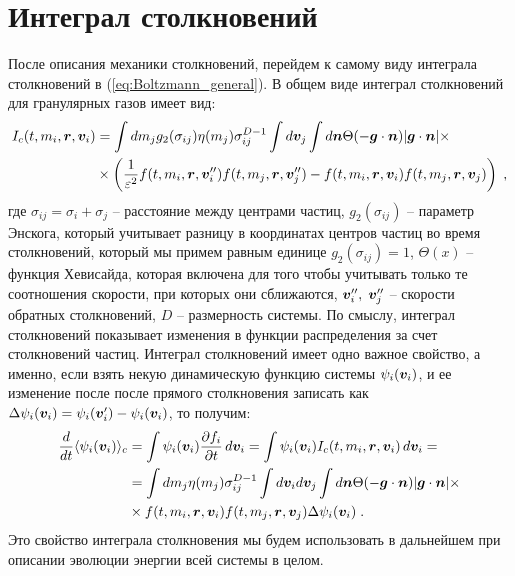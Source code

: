 \section{Интеграл столкновений}
После описания механики столкновений, перейдем к самому виду интеграла столкновений в (\ref{eq:Boltzmann_general}).
В общем виде интеграл столкновений для гранулярных газов имеет вид:
\begin{equation}
  \begin{split}
    I_c(t,m_i,\bm{r},\bm{v}_i) &= \int dm_jg_2(\sigma_{ij})\eta(m_j)\sigma^{D-1}_{ij}\int d\bm{v}_j\int d\bm{n}\Theta(-\bm{g}\cdot\bm{n})\vert\bm{g}\cdot\bm{n}\vert\times\\
    &\times\left(\frac{1}{\varepsilon^2}f(t,m_i,\bm{r},\bm{v}''_i)f(t,m_j,\bm{r},\bm{v}''_j)-f(t,m_i,\bm{r},\bm{v}_i)f(t,m_j,\bm{r},\bm{v}_j)\right)\;,
  \end{split}
\end{equation}
где $\sigma_{ij}=\sigma_i+\sigma_j$ -- расстояние между центрами частиц, $g_2(\sigma_{ij})$ -- параметр Энскога, который учитывает
разницу в координатах центров частиц во время столкновений, который мы примем равным единице $g_2(\sigma_{ij})=1$, $\Theta(x)$ -- 
функция Хевисайда, которая включена для того чтобы учитывать только те соотношения скорости, при которых они сближаются, 
$\bm{v}''_i,\;\bm{v}''_j$ -- скорости обратных столкновений, $D$ -- размерность системы. По смыслу, интеграл столкновений показывает изменения 
в функции распределения за счет столкновений частиц. Интеграл столкновений имеет одно важное свойство, а именно, если взять некую 
динамическую функцию системы $\psi_i(\bm{v}_i)$, и ее изменение после после прямого столкновения записать как 
$\Delta\psi_i(\bm{v}_i)=\psi_i(\bm{v}'_i)-\psi_i(\bm{v}_i)$, то получим:
\begin{equation}\label{eq:collision_integral_dynamic_function}
  \begin{split}
    \frac{d}{dt}\langle\psi_i(\bm{v}_i)\rangle_c &= \int\psi_i(\bm{v}_i)\frac{\partial f_i}{\partial t}\,d\bm{v}_i = \int\psi_i(\bm{v}_i)I_c(t,m_i,\bm{r},\bm{v}_i)\,d\bm{v}_i=\\
    &=\int dm_j\eta(m_j)\sigma^{D-1}_{ij}\int d\bm{v}_id\bm{v}_j\int d\bm{n}\Theta(-\bm{g}\cdot\bm{n})\vert\bm{g}\cdot\bm{n}\vert\times\\
    &\times f(t,m_i,\bm{r},\bm{v}_i)f(t,m_j,\bm{r},\bm{v}_j)\Delta\psi_i(\bm{v}_i)\;.
  \end{split}
\end{equation}
Это свойство интеграла столкновения мы будем использовать в дальнейшем при описании эволюции энергии всей системы в целом.

